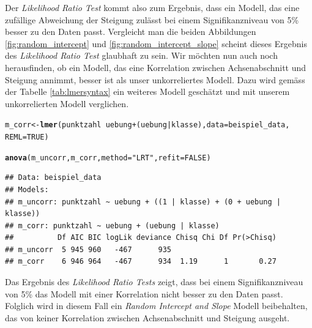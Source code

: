 \documentclass[12pt]{article}\usepackage[]{graphicx}\usepackage[]{color}
\makeatletter
\newcommand{\hlnum}[1]{\textcolor[rgb]{0.686,0.059,0.569}{#1}}%
\newcommand{\hlstr}[1]{\textcolor[rgb]{0.192,0.494,0.8}{#1}}%
\newcommand{\hlopt}[1]{\textcolor[rgb]{0,0,0}{#1}}%
\newcommand{\hlstd}[1]{\textcolor[rgb]{0.345,0.345,0.345}{#1}}%
\newcommand{\hlkwb}[1]{\textcolor[rgb]{0.69,0.353,0.396}{#1}}%
\newcommand{\hlkwc}[1]{\textcolor[rgb]{0.333,0.667,0.333}{#1}}%
\newcommand{\hlkwd}[1]{\textcolor[rgb]{0.737,0.353,0.396}{\textbf{#1}}}%
\newenvironment{kframe}{%
 \def\at@end@of@kframe{}%
 \ifinner\ifhmode%
  \def\at@end@of@kframe{\end{minipage}}%
  \begin{minipage}{\columnwidth}%
 \fi\fi%
 \def\FrameCommand##1{\hskip\@totalleftmargin \hskip-\fboxsep
 \colorbox{shadecolor}{##1}\hskip-\fboxsep
     \hskip-\linewidth \hskip-\@totalleftmargin \hskip\columnwidth}%
 \MakeFramed {\advance\hsize-\width
   \@totalleftmargin\z@ \linewidth\hsize
   \@setminipage}}%
 {\par\unskip\endMakeFramed%
 \at@end@of@kframe}
\newenvironment{knitrout}{}{} %
\makeatother
\begin{document}
Der \textit{Likelihood Ratio Test} kommt also zum Ergebnis, dass ein Modell, das eine zufällige Abweichung der Steigung zulässt bei einem Signifikanzniveau von 5\% besser zu den Daten passt. Vergleicht man die beiden Abbildungen \ref{fig:random_intercept} und \ref{fig:random_intercept_slope} scheint dieses Ergebnis des \textit{Likelihood Ratio Test} glaubhaft zu sein. Wir möchten nun auch noch herausfinden, ob ein Modell, das eine Korrelation zwischen Achsenabschnitt und Steigung annimmt, besser ist als unser unkorreliertes Modell. Dazu wird gemäss der Tabelle \ref{tab:lmersyntax} ein weiteres Modell geschätzt und mit unserem unkorrelierten Modell verglichen.

\singlespacing
\begin{knitrout}
\color{fgcolor}\begin{kframe}
\begin{alltt}
\hlstd{m_corr} \hlkwb{<-} \hlkwd{lmer}\hlstd{(punktzahl} \hlopt{~} \hlstd{uebung} \hlopt{+} \hlstd{(uebung} \hlopt{|} \hlstd{klasse),} \hlkwc{data} \hlstd{= beispiel_data,}
    \hlkwc{REML} \hlstd{=} \hlnum{TRUE}\hlstd{)}

\hlkwd{anova}\hlstd{(m_uncorr, m_corr,} \hlkwc{method} \hlstd{=} \hlstr{"LRT"}\hlstd{,} \hlkwc{refit} \hlstd{=} \hlnum{FALSE}\hlstd{)}
\end{alltt}
\begin{verbatim}
## Data: beispiel_data
## Models:
## m_uncorr: punktzahl ~ uebung + ((1 | klasse) + (0 + uebung | klasse))
## m_corr: punktzahl ~ uebung + (uebung | klasse)
##          Df AIC BIC logLik deviance Chisq Chi Df Pr(>Chisq)
## m_uncorr  5 945 960   -467      935                        
## m_corr    6 946 964   -467      934  1.19      1       0.27
\end{verbatim}
\end{kframe}
\end{knitrout}

Das Ergebnis des \textit{Likelihood Ratio Tests} zeigt, dass bei einem Signifikanzniveau von 5\% das Modell mit einer Korrelation nicht besser zu den Daten passt. Folglich wird in diesem Fall ein \textit{Random Intercept and Slope} Modell beibehalten, das von keiner Korrelation zwischen Achsenabschnitt und Steigung ausgeht.
\end{document}
